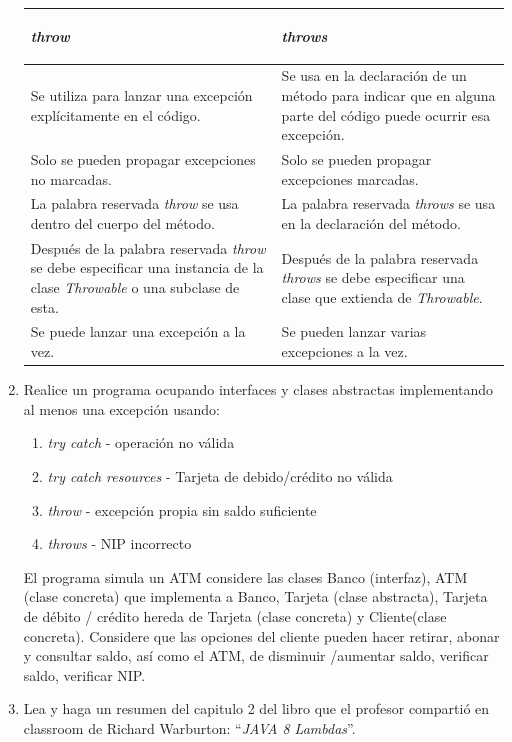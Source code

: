 \documentclass[12pt]{article}
\begin{document}
\begin{enumerate}
    \begin{table}[h!]
      \centering
      \begin{tabular}{|p{}|p{}|}
        \hline
        \begin{center} \textbf{\textit{throw}} \end{center} & \begin{center} \textbf{\textit{throws}} \end{center} \\ \hline 
        Se utiliza para lanzar una excepción explícitamente en el código. & Se usa en la declaración de un método para indicar que en alguna parte del código puede ocurrir esa excepción. \\ \hline
        Solo se pueden propagar excepciones no marcadas. & Solo se pueden propagar excepciones marcadas. \\ \hline
        La palabra reservada \textit{throw} se usa dentro del cuerpo del método. & La palabra reservada \textit{throws} se usa en la declaración del método. \\ \hline
        Después de la palabra reservada \textit{throw} se debe especificar una instancia de la clase \textit{Throwable} o una subclase de esta. & Después de la palabra reservada \textit{throws} se debe especificar una clase que extienda de \textit{Throwable}. \\ \hline
        Se puede lanzar una excepción a la vez. & Se pueden lanzar varias excepciones a la vez. \\ \hline
      \end{tabular}
    \end{table}

    \item Realice un programa ocupando interfaces y clases abstractas implementando al menos una excepción usando:
    \begin{enumerate}[label=\alph*.]
      \item \textit{try catch} - operación no válida
      \item \textit{try catch resources} - Tarjeta de debido/crédito no válida
      \item \textit{throw} - excepción propia sin saldo suficiente
      \item \textit{throws} - NIP incorrecto
    \end{enumerate}
    El programa simula un ATM considere las clases Banco (interfaz), ATM (clase concreta) que implementa a Banco, Tarjeta (clase abstracta), Tarjeta de débito / crédito hereda de Tarjeta (clase concreta) y Cliente(clase concreta). Considere que las opciones del cliente pueden hacer retirar, abonar y consultar saldo, así como el ATM, de disminuir /aumentar saldo, verificar saldo, verificar NIP.


    \item Lea y haga un resumen del capitulo 2 del libro que el profesor compartió en classroom de Richard Warburton: ``\textit{JAVA 8 Lambdas}''.
  \end{enumerate}
\end{document}
